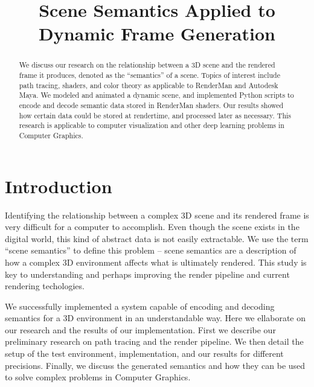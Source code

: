 \documentclass[conference]{IEEEtran}
\begin{document}
\title{Scene Semantics Applied to \\ Dynamic Frame Generation}

\author{
}

\maketitle

\begin{abstract}
We discuss our research on
the relationship between a 3D scene and the rendered frame it produces,
denoted as the ``semantics'' of a scene.
Topics of interest include path tracing, shaders, and color theory
as applicable to RenderMan and Autodesk Maya.
We modeled and animated a dynamic scene,
and implemented Python scripts to encode and decode semantic data
stored in RenderMan shaders.
Our results showed how certain data could be stored at rendertime,
and processed later as necessary.
This research is applicable to computer visualization
and other deep learning problems in Computer Graphics.
\end{abstract}

\section{Introduction}
\label{sec:introduction}
Identifying the relationship between a complex 3D scene and its rendered frame
is very difficult for a computer to accomplish.
Even though the scene exists in the digital world, this kind of
abstract data is not easily extractable.
We use the term ``scene semantics'' to define this problem --
scene semantics are a description of how a complex 3D environment
affects what is ultimately rendered.
This study is key to understanding and perhaps improving the
render pipeline and current rendering techologies.

We successfully implemented a system capable of encoding and decoding
semantics for a 3D environment in an understandable way.
Here we ellaborate on our research and the results of our implementation.
First we describe our preliminary research on path tracing and the render pipeline.
We then detail the setup of the test environment, implementation,
and our results for different precisions.
Finally, we discuss the generated semantics and how they can be used to solve
complex problems in Computer Graphics.
\end{document}
